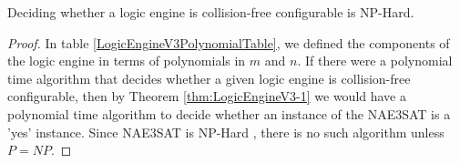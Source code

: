 \begin{thm}\label{thm:LogicEngineV3-2}
Deciding whether a logic engine is collision-free configurable is NP-Hard.
\end{thm}
\begin{proof}
In table \ref{LogicEngineV3PolynomialTable}, we defined the components of the logic engine in terms of polynomials in $m$ and $n$. If there were a polynomial time algorithm that decides whether a given logic engine is collision-free configurable, then by Theorem \ref{thm:LogicEngineV3-1} we would have a polynomial time algorithm to decide whether an instance of the NAE3SAT is a 'yes' instance.  Since NAE3SAT is NP-Hard \cite{NAE3SATisNPhard}, there is no such algorithm unless $P = NP$.
\end{proof}